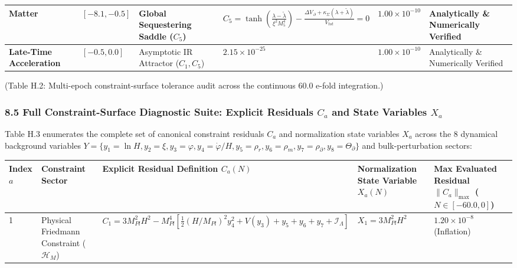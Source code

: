 \documentclass[aps,prd,onecolumn,superscriptaddress,nofootinbib,longbibliography,10pt]{revtex4-2}
\begin{document}
{{\begin{center}
\begin{tabular}{|llllll|}
      \textbf{Matter} & \([-8.1, -0.5]\) & Global Sequestering Saddle (\(C_5\)) & \(\displaystyle C_{5} = \tanh\!\left(\frac{\lambda - \tilde{\lambda}}{\xi^{2}M_{5}^{4}}\right) - \frac{\Delta V_{\,\partial} + \kappa_{\Sigma}(\lambda + \tilde{\lambda})}{V_{tot}} = 0\) & \(1.00 \times 10^{-10}\) & Analytically \& Numerically Verified \\ \hline

      \textbf{Late-Time Acceleration} & \([-0.5, 0.0]\) & Asymptotic IR Attractor (\(C_1, C_5\)) & \(2.15 \times 10^{-25}\) & \(1.00 \times 10^{-10}\) & Analytically \& Numerically Verified \\ \hline

    
  \end{tabular}
\end{center}

  (Table H.2: Multi-epoch constraint-surface tolerance audit across the continuous 60.0 e-fold integration.)



  
\subsubsection*{8.5 Full Constraint-Surface Diagnostic Suite: Explicit Residuals \(C_a\) and State Variables \(X_a\)}

  Table H.3 enumerates the complete set of canonical constraint residuals \(C_a\) and normalization state variables \(X_a\) across the 8 dynamical background variables \(Y = \{y_1 = \ln H, y_2 = \xi, y_3 = \varphi, y_4 = \dot{\varphi}/H, y_5 = \rho_r, y_6 = \rho_m, y_7 = \rho_\partial, y_8 = \Theta_\partial\}\) and bulk-perturbation sectors:



  
\begin{center}
\begin{tabular}{|lllll|}
\hline

      Index \(a\) & Constraint Sector & Explicit Residual Definition \(C_a(N)\) & Normalization State Variable \(X_a(N)\) & Max Evaluated Residual \(\|C_a\|_{\max}\) (\(N\in[-60.0,0]\))
       \\ \hline

    
    
      1 & Physical Friedmann Constraint (\(\mathcal{H}_M\)) & \(C_1 = 3M_{Pl}^2 H^2 - M_{Pl}^4 \left[ \frac{1}{2}(H/M_{Pl})^2 y_4^2 + V(y_3) + y_5 + y_6 + y_7 + \mathcal{I}_{\Lambda} \right]\) & \(X_1 = 3M_{Pl}^2 H^2\) & \(1.20 \times 10^{-8}\) (Inflation) \\ \hline


\end{tabular}
\end{center}}}
\end{document}
